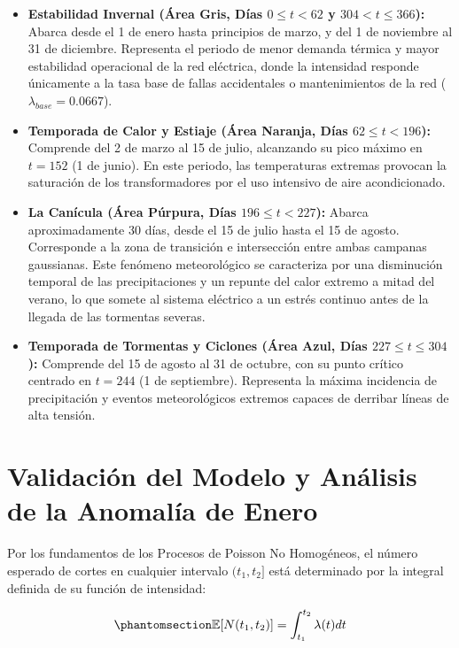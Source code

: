 \documentclass[
  spanish,
  us-letterpaper,
]{scrreprt}
\providecommand{\tightlist}{%
  \setlength{\itemsep}{0pt}\setlength{\parskip}{0pt}}
\numberwithin{equation}{section}
\theoremstyle{plain}
\theoremstyle{plain}
\theoremstyle{plain}
\theoremstyle{definition}
\theoremstyle{remark}
\begin{document}
\begin{itemize}
\tightlist
\item
  \textbf{Estabilidad Invernal (Área Gris, Días \(0 \le t < 62\) y
  \(304 < t \le 366\)):} Abarca desde el 1 de enero hasta principios de
  marzo, y del 1 de noviembre al 31 de diciembre. Representa el periodo
  de menor demanda térmica y mayor estabilidad operacional de la red
  eléctrica, donde la intensidad responde únicamente a la tasa base de
  fallas accidentales o mantenimientos de la red
  (\(\lambda_{base} = 0.0667\)).
\item
  \textbf{Temporada de Calor y Estiaje (Área Naranja, Días
  \(62 \le t < 196\)):} Comprende del 2 de marzo al 15 de julio,
  alcanzando su pico máximo en \(t = 152\) (1 de junio). En este
  periodo, las temperaturas extremas provocan la saturación de los
  transformadores por el uso intensivo de aire acondicionado.
\item
  \textbf{La Canícula (Área Púrpura, Días \(196 \le t < 227\)):} Abarca
  aproximadamente 30 días, desde el 15 de julio hasta el 15 de agosto.
  Corresponde a la zona de transición e intersección entre ambas
  campanas gaussianas. Este fenómeno meteorológico se caracteriza por
  una disminución temporal de las precipitaciones y un repunte del calor
  extremo a mitad del verano, lo que somete al sistema eléctrico a un
  estrés continuo antes de la llegada de las tormentas severas.
\item
  \textbf{Temporada de Tormentas y Ciclones (Área Azul, Días
  \(227 \le t \le 304\)):} Comprende del 15 de agosto al 31 de octubre,
  con su punto crítico centrado en \(t = 244\) (1 de septiembre).
  Representa la máxima incidencia de precipitación y eventos
  meteorológicos extremos capaces de derribar líneas de alta tensión.
\end{itemize}

\section{Validación del Modelo y Análisis de la Anomalía de
Enero}\label{validaciuxf3n-del-modelo-y-anuxe1lisis-de-la-anomaluxeda-de-enero}

Por los fundamentos de los Procesos de Poisson No Homogéneos, el número
esperado de cortes en cualquier intervalo \((t_1, t_2]\) está
determinado por la integral definida de su función de intensidad:

\begin{equation}\phantomsection\label{eq-integral-poisson}{
\mathbb{E}[N(t_1, t_2)] = \int_{t_1}^{t_2} \lambda(t) dt
}\end{equation}
\end{document}
